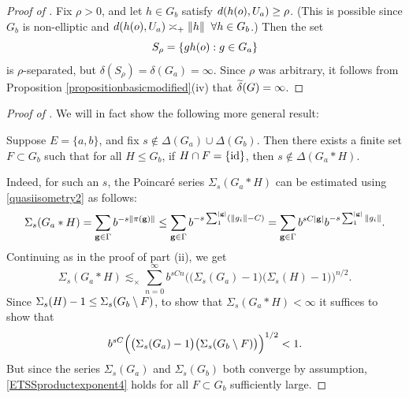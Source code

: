 \begin{proof}[Proof of ]
Fix $\rho > 0$, and let $h\in G_b$ satisfy $d(h(o),U_a) \geq \rho$. (This is possible since $G_b$ is non-elliptic and $d(h(o),U_a) \asymp_+ \|h\| \;\;\forall h\in G_b$.) Then the set
\[
S_\rho = \{gh(o) : g\in G_a\}
\]
is $\rho$-separated, but $\delta(S_\rho) = \delta(G_a) = \infty$. Since $\rho$ was arbitrary, it follows from Proposition \ref{propositionbasicmodified}(iv) that $\widetilde\delta(G) = \infty$.
\end{proof}
\begin{proof}[Proof of ]
We will in fact show the following more general result:
\begin{proposition}
Suppose $E = \{a,b\}$, and fix $s\notin \Delta(G_a)\cup\Delta(G_b)$. Then there exists a finite set $F\subset G_b$ such that for all $H\leq G_b$, if $H\cap F = \{\mathrm{id}\}$, then $s\notin\Delta(G_a\ast H)$.
\end{proposition}
\noindent Indeed, for such an $s$, the Poincar\'e series $\Sigma_s(G_a\ast H)$ can be estimated using \eqref{quasiisometry2} as follows:
\[
\Sigma_s(G_a\ast H) = \sum_{\mathbf g\in\Gamma} b^{-s\|\pi(\mathbf g)\|}
\leq \sum_{\mathbf g\in\Gamma} b^{-s\sum_1^{|\mathbf g|} (\|g_i\| - C)} = \sum_{\mathbf g\in\Gamma} b^{sC|\mathbf g|} b^{-s\sum_1^{|\mathbf g|} \|g_i\|}.
\]
Continuing as in the proof of part (ii), we get
\[
\Sigma_s(G_a\ast H) \lesssim_\times \sum_{n = 0}^\infty b^{sCn} \Big(\big(\Sigma_s(G_a) - 1\big)\big(\Sigma_s(H) - 1\big)\Big)^{n/2}.
\]
Since $\Sigma_s(H) - 1 \leq \Sigma_s(G_b\setminus F)$, to show that $\Sigma_s(G_a\ast H) < \infty$ it suffices to show that
\begin{equation}
\label{ETSSproductexponent4}
b^{sC} \Big(\big(\Sigma_s(G_a) - 1\big)\big(\Sigma_s(G_b\setminus F)\big)\Big)^{1/2} < 1.
\end{equation}
But since the series $\Sigma_s(G_a)$ and $\Sigma_s(G_b)$ both converge by assumption, \eqref{ETSSproductexponent4} holds for all $F\subset G_b$ sufficiently large.
\end{proof}

